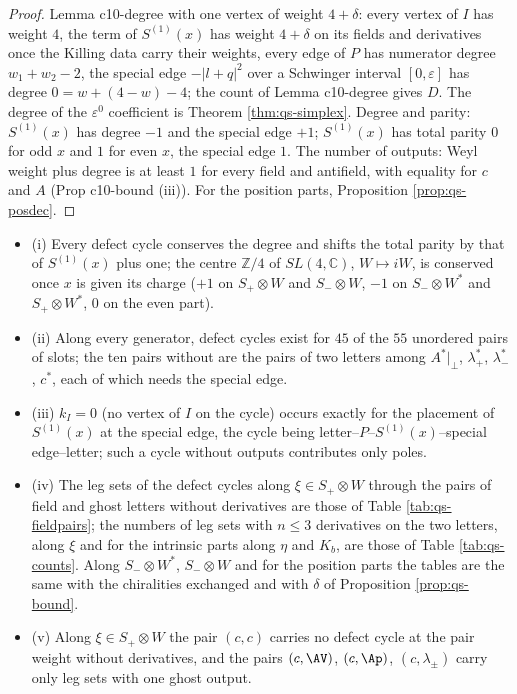 \begin{proof}
Lemma c10-degree with one vertex of weight $4+\delta$: every vertex of $I$ has weight $4$, the term of $S^{(1)}(x)$ has weight $4+\delta$ on its fields and derivatives once the Killing data carry their weights, every edge of $P$ has numerator degree $w_1+w_2-2$, the special edge $-|l+q|^2$ over a Schwinger interval $[0,\varepsilon]$ has degree $0=w+(4-w)-4$; the count of Lemma c10-degree gives $D$. The degree of the $\varepsilon^0$ coefficient is Theorem \ref{thm:qs-simplex}. Degree and parity: $S^{(1)}(x)$ has degree $-1$ and the special edge $+1$; $S^{(1)}(x)$ has total parity $0$ for odd $x$ and $1$ for even $x$, the special edge $1$. The number of outputs: Weyl weight plus degree is at least $1$ for every field and antifield, with equality for $c$ and $A$ (Prop c10-bound (iii)). For the position parts, Proposition \ref{prop:qs-posdec}.
\end{proof}

\begin{proposition}[Census]
\label{prop:qs-census}
\begin{itemize}
\item (i) Every defect cycle conserves the degree and shifts the total parity by that of $S^{(1)}(x)$ plus one; the centre $\mathbb Z/4$ of $SL(4,\mathbb C)$, $W\mapsto iW$, is conserved once $x$ is given its charge ($+1$ on $S_+\otimes W$ and $S_-\otimes W$, $-1$ on $S_-\otimes W^*$ and $S_+\otimes W^*$, $0$ on the even part).
\item (ii) Along every generator, defect cycles exist for $45$ of the $55$ unordered pairs of slots; the ten pairs without are the pairs of two letters among $A^*|_\perp$, $\lambda^*_+$, $\lambda^*_-$, $c^*$, each of which needs the special edge.
\item (iii) $k_I=0$ (no vertex of $I$ on the cycle) occurs exactly for the placement of $S^{(1)}(x)$ at the special edge, the cycle being letter--$P$--$S^{(1)}(x)$--special edge--letter; such a cycle without outputs contributes only poles.
\item (iv) The leg sets of the defect cycles along $\xi\in S_+\otimes W$ through the pairs of field and ghost letters without derivatives are those of Table \ref{tab:qs-fieldpairs}; the numbers of leg sets with $n\le3$ derivatives on the two letters, along $\xi$ and for the intrinsic parts along $\eta$ and $K_b$, are those of Table \ref{tab:qs-counts}. Along $S_-\otimes W^*$, $S_-\otimes W$ and for the position parts the tables are the same with the chiralities exchanged and with $\delta$ of Proposition \ref{prop:qs-bound}.
\item (v) Along $\xi\in S_+\otimes W$ the pair $(c,c)$ carries no defect cycle at the pair weight without derivatives, and the pairs $(c,\AV)$, $(c,\Ap)$, $(c,\lambda_\pm)$ carry only leg sets with one ghost output.
\end{itemize}
\end{proposition}

